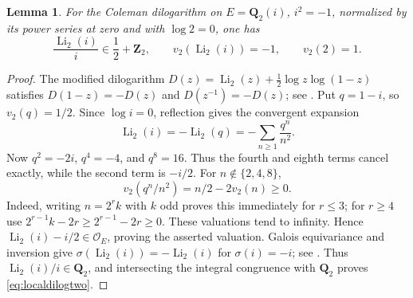 \documentclass[11pt,a4paper]{article}
\newtheorem{lemma}[theorem]{Lemma}
\theoremstyle{remark}
\newcommand{\Q}{\mathbf Q}
\newcommand{\Z}{\mathbf Z}
\newcommand{\OO}{\mathcal O}
\begin{document}
\begin{lemma}\label{lem:localdilogtwo}
For the Coleman dilogarithm on $E=\Q_2(i)$, $i^2=-1$, normalized
by its power series at zero and with $\log2=0$, one has
\begin{equation}\label{eq:localdilogtwo}
 \frac{\operatorname{Li}_2(i)}{i}\in\frac12+\Z_2,
 \qquad v_2(\operatorname{Li}_2(i))=-1,
 \qquad v_2(2)=1.
\end{equation}
\end{lemma}
\begin{proof}
The modified dilogarithm
$D(z)=\operatorname{Li}_2(z)+\frac12\log z\log(1-z)$
satisfies $D(1-z)=-D(z)$ and $D(z^{-1})=-D(z)$;
see \cite[equation~(1.8), p.~307, and p.~377]{BesserDeJeuCurves}.
Put $q=1-i$, so $v_2(q)=1/2$.
Since $\log i=0$, reflection gives the convergent expansion
\[
 \operatorname{Li}_2(i)
 =-\operatorname{Li}_2(q)
 =-\sum_{n\geq1}\frac{q^n}{n^2}.
\]
Now $q^2=-2i$, $q^4=-4$, and $q^8=16$. Thus the fourth and eighth
terms cancel exactly, while the second term is $-i/2$.
For $n\notin\{2,4,8\}$,
\[
 v_2(q^n/n^2)=n/2-2v_2(n)\geq0.
\]
Indeed, writing $n=2^rk$ with $k$ odd proves this immediately
for $r\leq3$; for $r\geq4$ use
$2^{r-1}k-2r\geq2^{r-1}-2r\geq0$.
These valuations tend to infinity. Hence
$\operatorname{Li}_2(i)-i/2\in\OO_E$, proving the asserted valuation.
Galois equivariance and inversion give
$\sigma(\operatorname{Li}_2(i))=-\operatorname{Li}_2(i)$
for $\sigma(i)=-i$; see
\cite[Remark~2.3 and equation~(1.2)]{BesserDeJeu}.
Thus $\operatorname{Li}_2(i)/i\in\Q_2$, and intersecting the integral
congruence with $\Q_2$ proves \eqref{eq:localdilogtwo}.
\end{proof}
\end{document}
